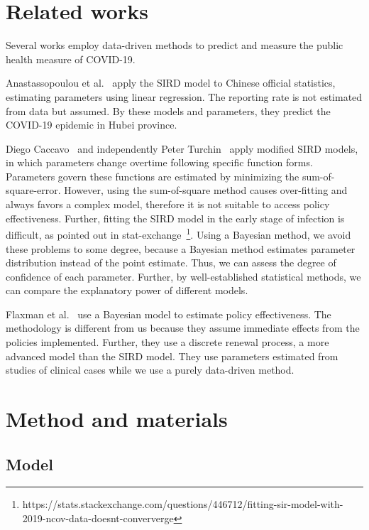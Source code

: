 \documentclass{article}
\begin{document}
\section{Related works}

Several works employ data-driven methods to predict and measure the public health measure of COVID-19.

Anastassopoulou et al.~\cite{Anastassopoulou2020} apply the SIRD model to Chinese official statistics, estimating parameters using linear regression.
The reporting rate is not estimated from data but assumed.
By these models and parameters, they predict the COVID-19 epidemic in Hubei province.

Diego Caccavo~\cite{Caccavo2020} and independently Peter Turchin~\cite{Turchin2020} apply modified SIRD models, in which parameters change overtime following specific function forms.
Parameters govern these functions are estimated by minimizing the sum-of-square-error.
However, using the sum-of-square method causes over-fitting and always favors a complex model, therefore it is not suitable to access policy effectiveness.
Further, fitting the SIRD model in the early stage of infection is difficult, as pointed out in stat-exchange~\footnote{https://stats.stackexchange.com/questions/446712/fitting-sir-model-with-2019-ncov-data-doesnt-conververge}.
Using a Bayesian method, we avoid these problems to some degree, because a Bayesian method estimates parameter distribution instead of the point estimate.
Thus, we can assess the degree of confidence of each parameter.
Further, by well-established statistical methods, we can compare the explanatory power of different models.

Flaxman et al.~\cite{Flaxman2020} use a Bayesian model to estimate policy effectiveness.
The methodology is different from us because they assume immediate effects from the policies implemented.
Further, they use a discrete renewal process, a more advanced model than the SIRD model.
They use parameters estimated from studies of clinical cases while we use a purely data-driven method.

\section{Method and materials}

\subsection{Model}
\end{document}
